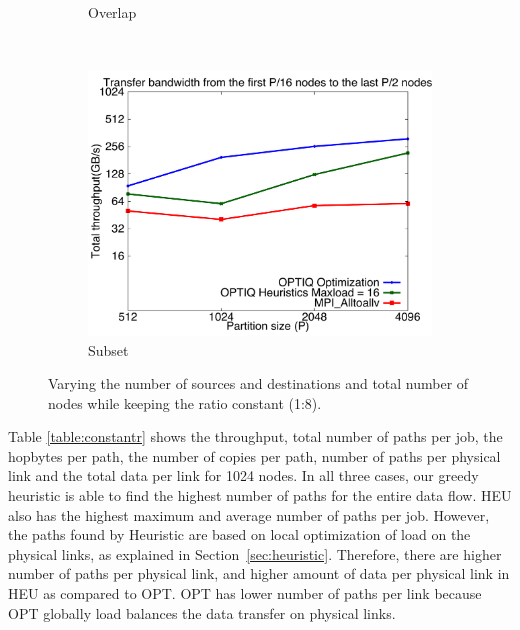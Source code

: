 \begin{figure}[!htbp]
\begin{subfigure}[b]{0.32\textwidth}
                \caption{Overlap}
                \label{fig:constantr_27}
        \end{subfigure}
        ~ %
        \begin{subfigure}[b]{0.32\textwidth}
                \includegraphics[width=\textwidth]{figures/constantr_87}
                \caption{Subset}
                \label{fig:constantr_87}
        \end{subfigure}
        \caption{\small Varying the number of sources and destinations and total number of nodes while keeping the ratio constant (1:8).}
	\vspace{-0.15in}
        \label{fig:constantr}
\end{figure}

Table \ref{table:constantr} shows the throughput, total number of paths per job, the hopbytes per path, the number of copies per path, number of paths per physical link and the total data per link for 1024 nodes. In all three cases, our greedy heuristic is able to find the highest number of paths for the entire data flow. HEU also has the highest maximum and average number of paths per job. However, the paths found by Heuristic are based on local optimization of load on the physical links, as explained in Section~\ref{sec:heuristic}. Therefore, there are higher number of paths per physical link, and higher amount of data per physical link in HEU as compared to OPT. OPT has lower number of paths per link because OPT globally load balances the data transfer on physical links.

